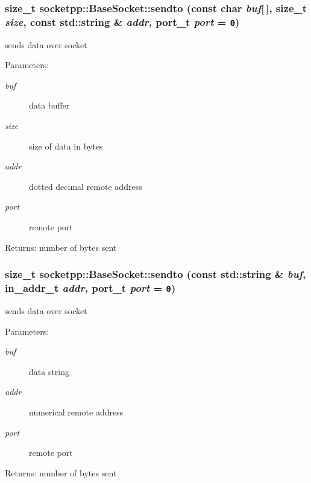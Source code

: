 \begin{CompactItemize}
{\subsubsection[{sendto}]{\setlength{\rightskip}{0pt plus 5cm}size\_\-t socketpp::BaseSocket::sendto (const char {\em buf}\mbox{[}$\,$\mbox{]}, \/  size\_\-t {\em size}, \/  const std::string \& {\em addr}, \/  {\bf port\_\-t} {\em port} = {\tt 0})}}
\label{classsocketpp_1_1BaseSocket_2b591cefe9fd8ac9f46ed7fbdd8caa82}


sends data over socket 

\begin{Desc}
\item[Parameters:]
\begin{description}
\item[{\em buf}]data buffer \item[{\em size}]size of data in bytes \item[{\em addr}]dotted decimal remote address \item[{\em port}]remote port \end{description}
\end{Desc}
\begin{Desc}
\item[Returns:]number of bytes sent \end{Desc}
\hypertarget{classsocketpp_1_1BaseSocket_d12e08b6f67a95a3181403c70f306f88}{
\subsubsection[{sendto}]{\setlength{\rightskip}{0pt plus 5cm}size\_\-t socketpp::BaseSocket::sendto (const std::string \& {\em buf}, \/  in\_\-addr\_\-t {\em addr}, \/  {\bf port\_\-t} {\em port} = {\tt 0})}}
\label{classsocketpp_1_1BaseSocket_d12e08b6f67a95a3181403c70f306f88}


sends data over socket 

\begin{Desc}
\item[Parameters:]
\begin{description}
\item[{\em buf}]data string \item[{\em addr}]numerical remote address \item[{\em port}]remote port \end{description}
\end{Desc}
\begin{Desc}
\item[Returns:]number of bytes sent \end{Desc}
\hypertarget{classsocketpp_1_1BaseSocket_33ef257bb6eb0f23ae0680df57738f3a}{
}
\end{CompactItemize}

